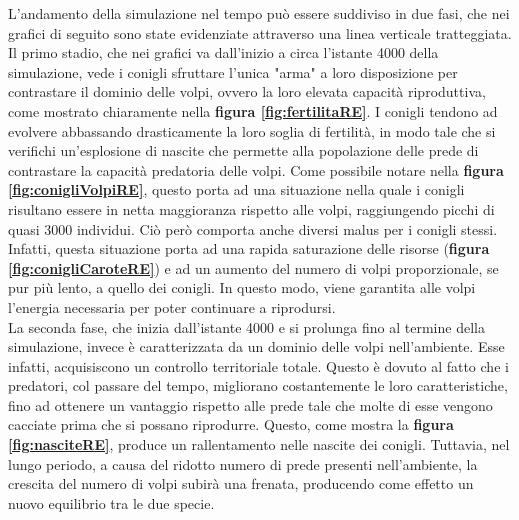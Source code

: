 \documentclass[11pt]{article}
\begin{document}
L'andamento della simulazione nel tempo può essere suddiviso in due fasi, che nei grafici di seguito sono state evidenziate attraverso una linea verticale tratteggiata. Il primo stadio, che nei grafici va dall'inizio a circa l'istante 4000 della simulazione, vede i conigli sfruttare l'unica "arma" a loro disposizione per contrastare il dominio delle volpi, ovvero la loro elevata capacità riproduttiva, come mostrato chiaramente nella \textbf{figura \ref{fig:fertilitaRE}}. I conigli tendono ad evolvere abbassando drasticamente la loro soglia di fertilità, in modo tale che si verifichi un'esplosione di nascite che permette alla popolazione delle prede di contrastare la capacità predatoria delle volpi. Come possibile notare nella \textbf{figura \ref{fig:conigliVolpiRE}}, questo porta ad una situazione nella quale i conigli risultano essere in netta maggioranza rispetto alle volpi, raggiungendo picchi di quasi 3000 individui. Ciò però comporta anche diversi malus per i conigli stessi. Infatti, questa situazione porta ad una rapida saturazione delle risorse (\textbf{figura \ref{fig:conigliCaroteRE}}) e ad un aumento del numero di volpi proporzionale, se pur più lento, a quello dei conigli. In questo modo, viene garantita alle volpi l'energia necessaria per poter continuare a riprodursi. \\
La seconda fase, che inizia dall'istante 4000 e si prolunga fino al termine della simulazione, invece è caratterizzata da un dominio delle volpi nell'ambiente. Esse infatti, acquisiscono un controllo territoriale totale. Questo è dovuto al fatto che i predatori, col passare del tempo, migliorano costantemente le loro caratteristiche, fino ad ottenere un vantaggio rispetto alle prede tale che molte di esse vengono cacciate prima che si possano riprodurre. Questo, come mostra la \textbf{figura \ref{fig:nasciteRE}}, produce un rallentamento nelle nascite dei conigli. Tuttavia, nel lungo periodo, a causa del ridotto numero di prede presenti nell'ambiente, la crescita del numero di volpi subirà una frenata, producendo come effetto un nuovo equilibrio tra le due specie.

\newpage
\end{document}
